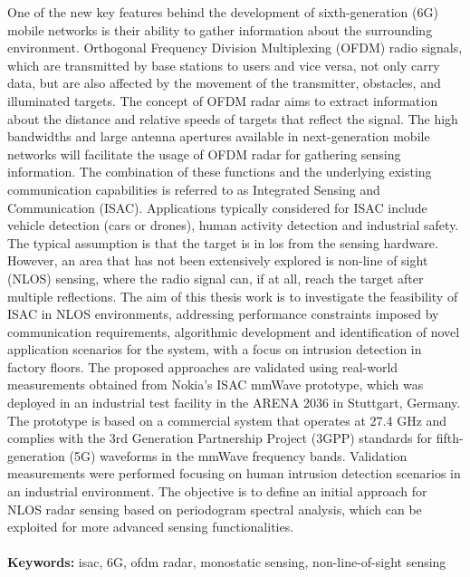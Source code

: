 \documentclass{Configuration_Files/PoliMi3i_thesis}
\begin{document}
One of the new key features behind the development of sixth-generation (6G) mobile networks is their ability to gather information about the surrounding environment. 
Orthogonal Frequency Division Multiplexing (OFDM) radio signals, which are transmitted by base stations to users and vice versa, not only carry data, but are also affected by the movement of the transmitter, obstacles, and illuminated targets.
The concept of OFDM radar aims to extract information about the distance and relative speeds of targets that reflect the signal.
The high bandwidths and large antenna apertures available in next-generation mobile networks will facilitate the usage of OFDM radar for gathering sensing information. 
The combination of these functions and the underlying existing communication capabilities is referred to as Integrated Sensing and Communication (ISAC).
Applications typically considered for ISAC include vehicle detection (cars or drones), human activity detection and industrial safety. 
The typical assumption is that the target is in \gls{los} from the sensing hardware. 
However, an area that has not been extensively explored is non-line of sight (NLOS) sensing, where the radio signal can, if at all, reach the target after multiple reflections.
The aim of this thesis work is to investigate the feasibility of ISAC in NLOS environments, addressing performance constraints imposed by communication requirements, algorithmic development and identification of novel application scenarios for the system, with a focus on intrusion detection in factory floors.
The proposed approaches are validated using real-world measurements obtained from Nokia's ISAC mmWave prototype, which was deployed in an industrial test facility in the ARENA 2036 in Stuttgart, Germany.
The prototype is based on a commercial system that operates at 27.4 GHz and complies with the 3rd Generation Partnership Project (3GPP) standards for fifth-generation (5G) waveforms in the mmWave frequency bands. 
Validation measurements were performed focusing on human intrusion detection scenarios in an industrial environment.
The objective is to define an initial approach for NLOS radar sensing based on periodogram spectral analysis, which can be exploited for more advanced sensing functionalities.
\\
\\
\textbf{Keywords:} isac, 6G, ofdm radar, monostatic sensing, non-line-of-sight sensing %
\end{document}
